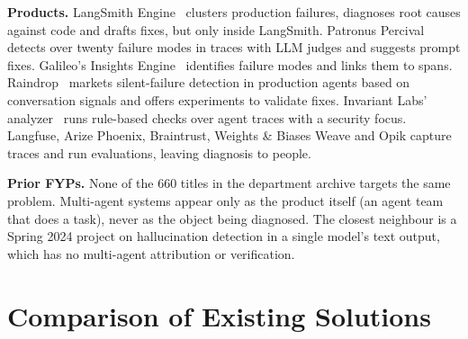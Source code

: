 \textbf{Products.} LangSmith Engine~\cite{langsmith} clusters production failures, diagnoses root causes against code and drafts fixes, but only inside LangSmith. Patronus Percival~\cite{percival} detects over twenty failure modes in traces with LLM judges and suggests prompt fixes. Galileo's Insights Engine~\cite{galileo} identifies failure modes and links them to spans. Raindrop~\cite{raindrop} markets silent-failure detection in production agents based on conversation signals and offers experiments to validate fixes. Invariant Labs' analyzer~\cite{invariant} runs rule-based checks over agent traces with a security focus. Langfuse, Arize Phoenix, Braintrust, Weights \& Biases Weave and Opik capture traces and run evaluations, leaving diagnosis to people.

\textbf{Prior FYPs.} None of the 660 titles in the department archive targets the same problem. Multi-agent systems appear only as the product itself (an agent team that does a task), never as the object being diagnosed. The closest neighbour is a Spring 2024 project on hallucination detection in a single model's text output, which has no multi-agent attribution or verification.

\section{Comparison of Existing Solutions}

